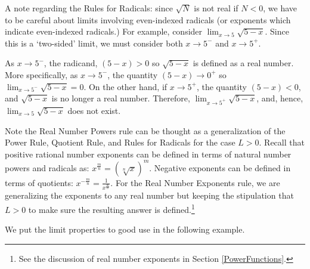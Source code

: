 \documentclass{ximera}
\begin{document}
A note regarding the Rules for Radicals:  since $\sqrt{N}$ is not real  if $N<0$, we have to be careful about limits involving even-indexed radicals (or exponents which indicate even-indexed radicals.)   For example, consider $\lim_{x \rightarrow 5} \sqrt{5-x}$.  Since this is a `two-sided' limit, we must consider both $x \rightarrow 5^{-}$ and $x \rightarrow 5^{+}$.



As $x \rightarrow 5^{-}$, the radicand, $(5-x) >0$ so $\sqrt{5-x}$ is defined as a real number.  More specifically, as $x \rightarrow 5^{-}$, the quantity $(5-x) \rightarrow 0^{+}$ so $\lim_{x \rightarrow 5^{-}} \sqrt{5-x} = 0$.  On the other hand, if $x \rightarrow 5^{+}$, the quantity $(5-x) < 0$, and $\sqrt{5-x}$ is no longer a real number.  Therefore, $\lim_{x \rightarrow 5^{+}} \sqrt{5-x}$, and, hence, $\lim_{x \rightarrow 5} \sqrt{5-x}$ does not exist.



Note the Real Number Powers rule can be thought as a generalization of the Power Rule, Quotient Rule, and  Rules for Radicals for the case $L>0$. Recall that positive rational number exponents can be defined in terms of natural number powers and radicals as:  $x^{\frac{m}{n}} = \left( \sqrt[n]{x}\right)^{m}$.  Negative exponents can be defined in terms of quotients:  $x^{-\frac{m}{n}} = \frac{1}{x^{\frac{m}{n}}}$.  For the Real Number Exponents rule, we are generalizing the exponents to any real number but keeping the stipulation that $L>0$ to make sure the resulting answer is defined.\footnote{See the discussion of real number exponents in  Section \ref{PowerFunctions}.}



We put the limit properties to good use in the following example.
\end{document}
